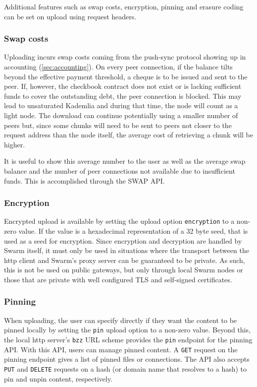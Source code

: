 Additional features such as swap costs, encryption, pinning and erasure coding can be set on upload using request headers. 


\subsubsection{Swap costs}

Uploading incurs swap costs coming from the push-sync protocol showing up in  accounting (\ref{sec:accounting}). On every peer connection, if the balance tilts beyond the effective payment threshold, a cheque is to be issued and sent to the peer. If, however, the checkbook contract does not exist or is lacking sufficient funds to cover the outstanding debt, the peer connection is blocked. This may lead to unsaturated Kademlia and during that time, the node will count as a light node. The download can continue potentially using a smaller number of peers but, since some chunks will need to be sent to peers not closer to the request address than the node itself, the average cost of retrieving a chunk will be higher. 

It is useful to show this average number to the user as well as the average swap balance and the number of peer connections not available due to insufficient funds. This is accomplished through the SWAP API.

\subsubsection{Encryption}

Encrypted upload is available by setting the upload option \lstinline{encryption} to a non-zero value. If the value is a hexadecimal representation of a 32 byte seed, that is used as a seed for encryption. Since encryption and decryption are handled by Swarm itself, it must only be used in situations where the transport between the http client and Swarm's proxy server can be guaranteed to be private. As such, this is not be used on public gateways, but only through local Swarm nodes or those that are private with well configured TLS and self-signed certificates.

\subsubsection{Pinning}

When uploading, the user can specify directly if they want the content to be pinned locally by setting the \lstinline{pin} upload option to a non-zero value. Beyond this, the local http server's \lstinline{bzz} URL scheme provides the \lstinline{pin} endpoint for the pinning API. With this API, users can manage pinned content. A \lstinline{GET} request on the pinning endpoint gives a list of pinned files or connections.  The API also accepts \lstinline{PUT} and \lstinline{DELETE} requests on a hash (or domain name that resolves to a hash) to pin and unpin content, respectively.  

